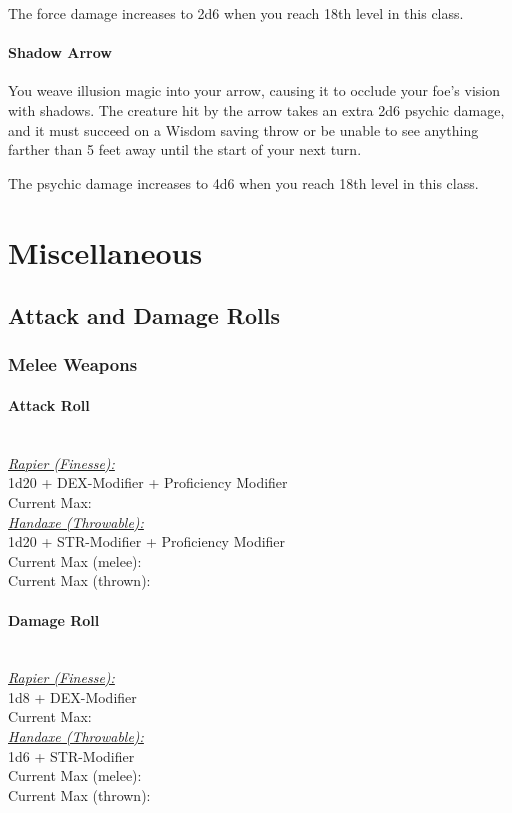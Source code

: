 \documentclass[letterpaper,openany,oneside,twocolumn]{book}
\begin{document}
The force damage increases to 2d6 when you reach 18th level in this class.

\paragraph{Shadow Arrow} You weave illusion magic into your arrow, causing it to occlude your foe’s vision with shadows. The creature hit by the arrow takes an extra 2d6 psychic damage, and it must succeed on a Wisdom saving throw or be unable to see anything farther than 5 feet away until the start of your next turn.

The psychic damage increases to 4d6 when you reach 18th level in this class.

\vfill\eject

\section*{Miscellaneous}
\subsection*{Attack and Damage Rolls}
\subsubsection*{Melee Weapons}
\paragraph*{Attack Roll}\hfill\\
\underline{\textit{Rapier (Finesse):}}\\
1d20 + DEX-Modifier + Proficiency Modifier\\
\indent Current Max: 
\\
\underline{\textit{Handaxe (Throwable):}}\\
1d20 + STR-Modifier + Proficiency Modifier\\
\indent Current Max (melee): \\
\indent Current Max (thrown): 
\paragraph*{Damage Roll}\hfill\\
\underline{\textit{Rapier (Finesse):}}\\
1d8 + DEX-Modifier\\
\indent Current Max: 
\\
\underline{\textit{Handaxe (Throwable):}}\\
1d6 + STR-Modifier\\
\indent Current Max (melee): \\
\indent Current Max (thrown): 
\end{document}
